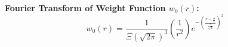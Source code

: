 \documentclass[letterpaper,twocolumn,amsmath,amssymb,prb]{revtex4-1}
\begin{document}
\begin{widetext}
\noindent\textbf{Fourier Transform of Weight Function $w_0(r)$:}
\begin{equation}{w_0(r)=\frac{1}{\Xi(\sqrt{2\pi})^3}\left(\frac{1}{r^2}\right)e^{-\left(\frac{r-\frac{\alpha}{2}}{\frac{\Xi}{\sqrt{2}}}\right)^2}}\end{equation}

\end{widetext}
\end{document}
